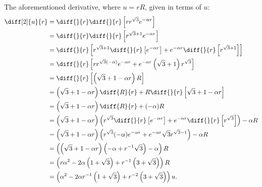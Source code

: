 \documentclass[a4paper, 12pt]{config/homework}
\begin{document}
\pagebreak\noindent
The aforementioned derivative, where \(u=rR\), given in terms of \(u\):
\begin{align*}
\diff[2]{u}{r} &= \diff{}{r}\diff{}{r}\left[rr^{\sqrt{3}}e^{-\alpha r}\right]
\\&= \diff{}{r}\diff{}{r}\left[r^{\sqrt{3}+1}e^{-\alpha r}\right]
\\&= \diff{}{r}\left[r^{\sqrt{3}+1}\diff{}{r}\left[e^{-\alpha r}\right] + e^{-\alpha r}\diff{}{r}\left[r^{\sqrt{3}+1}\right]\right]
\\&= \diff{}{r}\left[rr^{\sqrt{3}(-\alpha)}e^{-\alpha r} + e^{-\alpha r}\left(\sqrt{3}+1\right)r^{\sqrt{3}}\right]
\\&= \diff{}{r}\left[\left(\sqrt{3}+1-\alpha r\right)R\right]
\\&= \left(\sqrt{3}+1-\alpha r\right)\diff{R}{r} + R\diff{}{r}\left[\sqrt{3}+1-\alpha r\right]
\\&= \left(\sqrt{3}+1-\alpha r\right)\diff{R}{r} + (-\alpha)R
\\&= \left(\sqrt{3}+1-\alpha r\right)\left(r^{\sqrt{3}}\diff{}{r}\left[e^{-\alpha r}\right] + e^{-\alpha r}\diff{}{r}\left[r^{\sqrt{3}}\right]\right) -\alpha R
\\&= \left(\sqrt{3}+1-\alpha r\right)\left(r^{\sqrt{3}}(-\alpha)e^{-\alpha r} + e^{-\alpha r}\sqrt{3}r^{\sqrt{3}-1}\right)-\alpha R
\\&= \left( \left(\sqrt{3}+1-\alpha r\right)\left(-\alpha + r^{-1}\sqrt{3}\right) -\alpha\right)R
\\&= \left(r\alpha^2 -2\alpha\left(1 + \sqrt{3}\right) + r^{-1}\left(3 + \sqrt{3}\right)\right)R
\\&= \left(\alpha^2 - 2\alpha r^{-1}\left(1+\sqrt{3}\right) + r^{-2}\left(3+\sqrt{3}\right)\right)u.
\end{align*}
\end{document}
